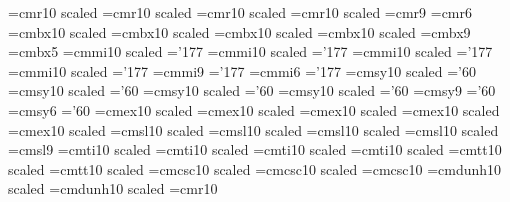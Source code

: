 
 \font\twentyfourrm=cmr10               scaled
 \font\seventeenrm=cmr10                scaled
 \font\fourteenrm=cmr10                 scaled
 \font\twelverm=cmr10                   scaled
 \font\ninerm=cmr9            \font\sixrm=cmr6
 \font\twentyfourbf=cmbx10              scaled
 \font\seventeenbf=cmbx10               scaled
 \font\fourteenbf=cmbx10                scaled
 \font\twelvebf=cmbx10                  scaled
 \font\ninebf=cmbx9            \font\sixbf=cmbx5
 \font\twentyfouri=cmmi10 scaled  \skewchar\twentyfouri='177
 \font\seventeeni=cmmi10  scaled  \skewchar\seventeeni='177
 \font\fourteeni=cmmi10   scaled  \skewchar\fourteeni='177
 \font\twelvei=cmmi10     scaled  \skewchar\twelvei='177
 \font\ninei=cmmi9                         \skewchar\ninei='177
 \font\sixi=cmmi6                          \skewchar\sixi='177
 \font\twentyfoursy=cmsy10 scaled \skewchar\twentyfoursy='60
 \font\seventeensy=cmsy10  scaled \skewchar\seventeensy='60
 \font\fourteensy=cmsy10   scaled \skewchar\fourteensy='60
 \font\twelvesy=cmsy10     scaled \skewchar\twelvesy='60
 \font\ninesy=cmsy9                        \skewchar\ninesy='60
 \font\sixsy=cmsy6                         \skewchar\sixsy='60
 \font\twentyfourex=cmex10  scaled
 \font\seventeenex=cmex10   scaled
 \font\fourteenex=cmex10    scaled
 \font\twelveex=cmex10      scaled
 \font\elevenex=cmex10      scaled\magstephalf
 \font\twentyfoursl=cmsl10  scaled
 \font\seventeensl=cmsl10   scaled
 \font\fourteensl=cmsl10    scaled
 \font\twelvesl=cmsl10      scaled
 \font\ninesl=cmsl9
 \font\twentyfourit=cmti10 scaled
 \font\seventeenit=cmti10  scaled
 \font\fourteenit=cmti10   scaled
 \font\twelveit=cmti10     scaled
 \font\twentyfourtt=cmtt10 scaled
 \font\twelvett=cmtt10     scaled
 \font\twentyfourcp=cmcsc10 scaled
 \font\twelvecp=cmcsc10    scaled
 \font\tencp=cmcsc10
 \font\hepbig=cmdunh10     scaled
 \font\hep=cmdunh10        scaled
 \newfam\cpfam
 \font\tenfib=cmr10  %
 \newcount\f@ntkey            {}
 \def\samef@nt{\relax \ifcase\f@ntkey \rm \or\oldstyle \or\or
          \or\it \or\sl \or\bf \or\tt \or\caps \fi }

